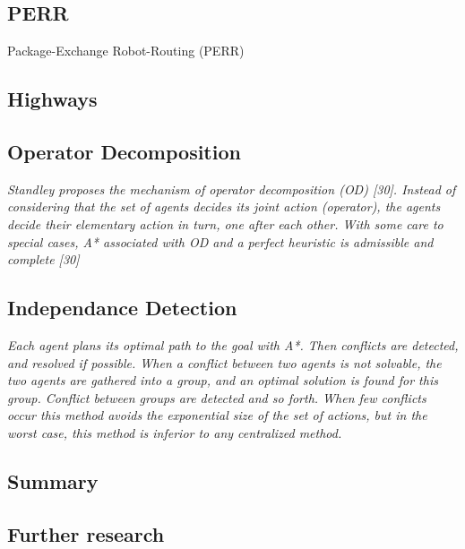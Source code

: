 \documentclass[a4paper,11pt]{article}
\begin{document}
\subsection{PERR}
Package-Exchange Robot-Routing (PERR)

\subsection{Highways}
\cite{cohen2016bounded}

\subsection{Operator Decomposition}
\textit{Standley proposes the mechanism of operator decomposition (OD) [30]. Instead of considering that the set of agents decides its joint action (operator), the agents decide their elementary action in turn, one after each other. With some care to special cases, A* associated with OD and a perfect heuristic is admissible and complete [30]}

\subsection{Independance Detection}
\textit{Each agent plans its optimal path to the goal with A*. Then conflicts are detected, and resolved if possible. When a conflict between two agents is not solvable, the two agents are gathered into a group, and an optimal solution is found for this group. Conflict between groups are detected and so forth. When few conflicts occur this method avoids the exponential size of the set of actions, but in the worst case, this method is inferior to any centralized method.}



\subsection{Summary}


\subsection{Further research}




\end{document}

